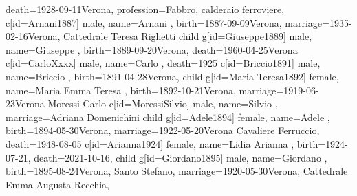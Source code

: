 \documentclass{article}
\begin{document}
\begin{midpage}
\begin{center}
\begin{genealogypicture}
{{{{{                    death={1928-09-11}{Verona},
                    profession={Fabbro, calderaio ferroviere},
                }
                c[id=Arnani1887]{
                    male,
                    name={Arnani },
                    birth={1887-09-09}{Verona},
                    marriage={1935-02-16}{Verona, Cattedrale \newline Teresa Righetti}
                }
                child{
                    g[id=Giuseppe1889]{
                        male,
                        name={Giuseppe },
                        birth={1889-09-20}{Verona},
                        death={1960-04-25}{Verona}
                    }
                    c[id=CarloXxxx]{
                        male,
                        name={Carlo },
                        death={1925}{}
                    }
                }
                c[id=Briccio1891]{
                    male,
                    name={Briccio },
                    birth={1891-04-28}{Verona},
                }
                child{
                    g[id=Maria Teresa1892]{
                        female,
                        name={Maria Emma Teresa },
                        birth={1892-10-21}{Verona},
                        marriage={1919-06-23}{Verona \newline Moressi Carlo}
                    }
                    c[id=MoressiSilvio]{
                        male,
                        name={Silvio },
                        marriage={Adriana Domenichini}{}
                    }
                }
                child{
                    g[id=Adele1894]{
                        female,
                        name={Adele },
                        birth={1894-05-30}{Verona},
                        marriage={1922-05-20}{Verona \newline Cavaliere Ferruccio},
                        death={1948-08-05}{}
                    }
                    c[id=Arianna1924]{
                        female,
                        name={Lidia Arianna },
                        birth={1924-07-21}{},
                        death={2021-10-16}{},
                    }
                }
                child{
                    g[id=Giordano1895]{
                        male,
                        name={Giordano },
                        birth={1895-08-24}{Verona, Santo Stefano},
                        marriage={1920-05-30}{Verona, Cattedrale \newline Emma Augusta Recchia},
}}}}}}
\end{genealogypicture}
\end{center}
\end{midpage}
\end{document}
